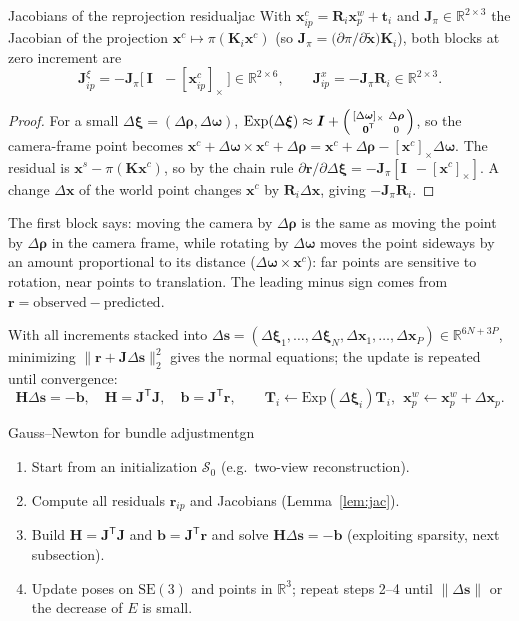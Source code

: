 \documentclass[11pt,a4paper]{article}
\newcommand{\R}{\mathbb{R}}
\newcommand{\SE}{\mathrm{SE}(3)}
\newcommand{\sk}[1]{[#1]_{\times}}
\newcommand{\norm}[1]{\lVert #1\rVert}
\newcommand{\tr}{^{\mathsf T}}
\begin{document}
\begin{lemma}{Jacobians of the reprojection residual}{jac}
With $\bm x^c_{ip}=\bm R_i\bm x^w_p+\bm t_i$ and $\bm J_\pi\in\R^{2\times3}$ the Jacobian of the projection $\bm x^c\mapsto\pi(\bm K_i\bm x^c)$ (so $\bm J_\pi=\bigl(\partial\pi/\partial\tilde{\bm x}\bigr)\bm K_i$), both blocks at zero increment are
\[
\bm J^{\xi}_{ip}=-\bm J_\pi\bigl[\ \bm I\ \ \ -\sk{\bm x^c_{ip}}\ \bigr]\in\R^{2\times6},\qquad
\bm J^x_{ip}=-\bm J_\pi\bm R_i\in\R^{2\times3}.
\]
\end{lemma}
\begin{proof}
For a small $\Delta\bm\xi=(\Delta\bm\rho,\Delta\bm\omega)$, $\mathrm{Exp}(\Delta\bm\xi)\approx\bm I+\begin{psmallmatrix}\sk{\Delta\bm\omega}&\Delta\bm\rho\\\bm 0\tr&0\end{psmallmatrix}$, so the camera-frame point becomes
$\bm x^c+\Delta\bm\omega\times\bm x^c+\Delta\bm\rho=\bm x^c+\Delta\bm\rho-\sk{\bm x^c}\Delta\bm\omega$. The residual is $\bm x^s-\pi(\bm K\bm x^c)$, so by the chain rule $\partial\bm r/\partial\Delta\bm\xi=-\bm J_\pi[\bm I\ \ -\sk{\bm x^c}]$.
A change $\Delta\bm x$ of the world point changes $\bm x^c$ by $\bm R_i\Delta\bm x$, giving $-\bm J_\pi\bm R_i$.
\end{proof}

\begin{intuition}
The first block says: moving the camera by $\Delta\bm\rho$ is the same as moving the point by $\Delta\bm\rho$ in the camera frame, while rotating by $\Delta\bm\omega$ moves the point sideways by an amount proportional to its distance ($\Delta\bm\omega\times\bm x^c$): far points are sensitive to rotation, near points to translation. The leading minus sign comes from $\bm r=\text{observed}-\text{predicted}$.
\end{intuition}

With all increments stacked into $\Delta\bm s=(\Delta\bm\xi_1,\dots,\Delta\bm\xi_N,\Delta\bm x_1,\dots,\Delta\bm x_P)\in\R^{6N+3P}$, minimizing $\norm{\bm r+\bm J\Delta\bm s}_2^2$ gives the normal equations; the update is repeated until convergence:
\[
\bm H\Delta\bm s=-\bm b,\quad \bm H=\bm J\tr\bm J,\quad\bm b=\bm J\tr\bm r,\qquad \bm T_i\leftarrow\mathrm{Exp}(\Delta\bm\xi_i)\bm T_i,\ \ \bm x^w_p\leftarrow\bm x^w_p+\Delta\bm x_p .
\]

\begin{algorithm}{Gauss--Newton for bundle adjustment}{gn}
\begin{enumerate}[nosep]
\item Start from an initialization $\mathcal S_0$ (e.g.\ two-view reconstruction).
\item Compute all residuals $\bm r_{ip}$ and Jacobians (Lemma~\ref{lem:jac}).
\item Build $\bm H=\bm J\tr\bm J$ and $\bm b=\bm J\tr\bm r$ and solve $\bm H\Delta\bm s=-\bm b$ (exploiting sparsity, next subsection).
\item Update poses on $\SE$ and points in $\R^3$; repeat steps 2--4 until $\norm{\Delta\bm s}$ or the decrease of $E$ is small.
\end{enumerate}
\end{algorithm}
\end{document}
